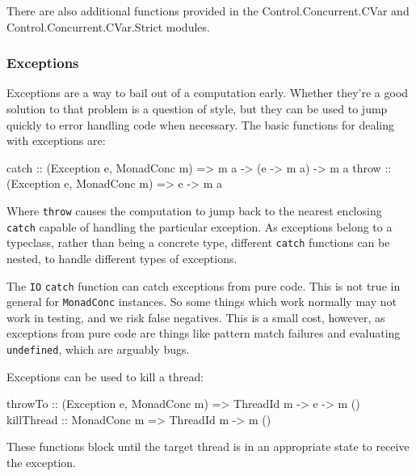 There are also additional functions provided in the
Control\-.Concurrent\-.CVar and Control\-.Concurrent\-.CVar\-.Strict
modules.

\subsubsection{Exceptions}
\label{sec:abstraction-typeclass-excs}

Exceptions are a way to bail out of a computation early. Whether
they're a good solution to that problem is a question of style, but
they can be used to jump quickly to error handling code when
necessary. The basic functions for dealing with exceptions are:

\begin{haskellcode}
catch :: (Exception e, MonadConc m) => m a -> (e -> m a) -> m a
throw :: (Exception e, MonadConc m) => e -> m a
\end{haskellcode}

Where \verb|throw| causes the computation to jump back to the nearest
enclosing \verb|catch| capable of handling the particular
exception. As exceptions belong to a typeclass, rather than being a
concrete type, different \verb|catch| functions can be nested, to
handle different types of exceptions.

\begin{departure}
  The \verb|IO| \verb|catch| function can catch exceptions from pure
  code. This is not true in general for \verb|MonadConc| instances.
  So some things which work normally may not work in testing, and we
  risk false negatives. This is a small cost, however, as exceptions
  from pure code are things like pattern match failures and evaluating
  \verb|undefined|, which are arguably bugs.
\end{departure}

Exceptions can be used to kill a thread:

\begin{haskellcode}
throwTo :: (Exception e, MonadConc m) => ThreadId m -> e -> m ()
killThread :: MonadConc m => ThreadId m -> m ()
\end{haskellcode}

These functions block until the target thread is in an appropriate
state to receive the exception.

